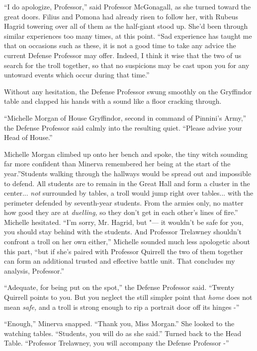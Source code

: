 ``I do apologize, Professor,'' said Professor McGonagall, as she turned
toward the great doors. Filius and Pomona had already risen to follow
her, with Rubeus Hagrid towering over all of them as the half-giant
stood up. She'd been through similar experiences too many times, at this
point. ``Sad experience has taught me that on occasions such as these,
it is not a good time to take any advice the current Defense Professor
may offer. Indeed, I think it wise that the two of us search for the
troll together, so that no suspicions may be cast upon you for any
untoward events which occur during that time.''

Without any hesitation, the Defense Professor swung smoothly on the
Gryffindor table and clapped his hands with a sound like a floor
cracking through.

``Michelle Morgan of House Gryffindor, second in command of Pinnini's
Army,'' the Defense Professor said calmly into the resulting quiet.
``Please advise your Head of House.''

Michelle Morgan climbed up onto her bench and spoke, the tiny witch
sounding far more confident than Minerva remembered her being at the
start of the year.''Students walking through the hallways would be
spread out and impossible to defend. All students are to remain in the
Great Hall and form a cluster in the center... \emph{not}
surrounded by tables, a troll would jump right over tables... with
the perimeter defended by seventh-year students. From the armies only,
no matter how good they are at \emph{duelling,} so they don't get in
each other's lines of fire.'' Michelle hesitated. ``I'm sorry, Mr.
Hagrid, but "--- it wouldn't be safe for you, you should stay behind with
the students. And Professor Trelawney shouldn't confront a troll on her
own either,'' Michelle sounded much less apologetic about this part,
``but if she's paired with Professor Quirrell the two of them together
can form an additional trusted and effective battle unit. That concludes
my analysis, Professor.''

``Adequate, for being put on the spot,'' the Defense Professor said.
``Twenty Quirrell points to you. But you neglect the still simpler point
that \emph{home} does not mean \emph{safe,} and a troll is strong enough
to rip a portrait door off its hinges -''

``Enough,'' Minerva snapped. ``Thank you, Miss Morgan.'' She looked to
the watching tables. ``Students, you will do as she said.'' Turned back
to the Head Table. ``Professor Trelawney, you will accompany the Defense
Professor -''

